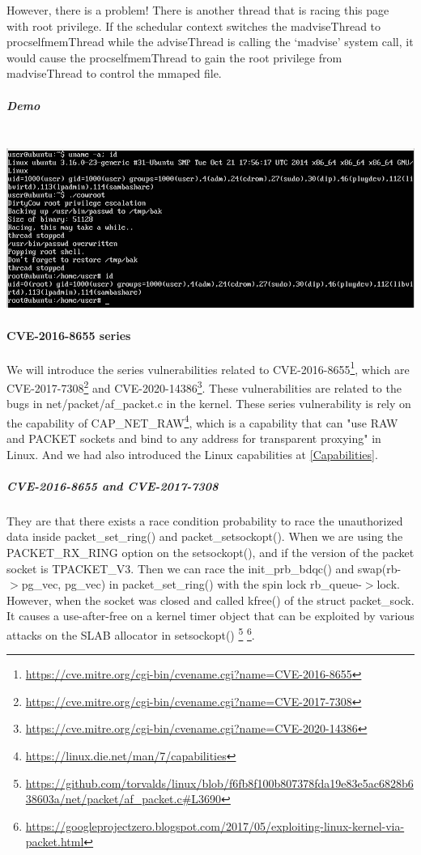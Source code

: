 However, there is a problem! There is another thread that is racing this page with root
privilege. If the schedular context switches the madviseThread to procselfmemThread while
the adviseThread is calling the `madvise' system call, it would cause the
procselfmemThread to gain the root privilege from madviseThread to control the mmaped file.

\subparagraph{Demo}\mbox{}\\
\includegraphics[width=.5\textwidth]{src/Screenshot_2021-12-26_05-14-58.png}
\label{qemumachine}

\paragraph{CVE-2016-8655 series}
We will introduce the series vulnerabilities related to CVE-2016-8655\footnote{
    \url{https://cve.mitre.org/cgi-bin/cvename.cgi?name=CVE-2016-8655}}, which are
CVE-2017-7308\footnote{\url{https://cve.mitre.org/cgi-bin/cvename.cgi?name=CVE-2017-7308}}
and CVE-2020-14386\footnote{\url{https://cve.mitre.org/cgi-bin/cvename.cgi?name=CVE-2020-14386}}.
These vulnerabilities are related to the bugs in net/packet/af\_packet.c in the kernel.
These series vulnerability is rely on the capability of CAP\_NET\_RAW\footnote{\url{https://linux.die.net/man/7/capabilities}},
which is a capability that can "use RAW and PACKET sockets and bind to
any address for transparent proxying" in Linux. And we had also introduced the Linux
capabilities at \ref{Capabilities}.

\subparagraph{CVE-2016-8655 and CVE-2017-7308} They are that there exists a race condition probability to
race the unauthorized data inside packet\_set\_ring() and packet\_setsockopt().
When we are using the PACKET\_RX\_RING option on the setsockopt(), and if the
version of the packet socket is TPACKET\_V3. Then we can race the init\_prb\_bdqc()
and swap(rb-$>$pg\_vec, pg\_vec) in packet\_set\_ring() with the spin lock rb\_queue-$>$lock.
However, when the socket was closed and called kfree() of the struct packet\_sock.
It causes a use-after-free on a kernel timer object that can be exploited
by various attacks on the SLAB allocator in setsockopt()
\footnote{\url{https://github.com/torvalds/linux/blob/f6fb8f100b807378fda19e83e5ac6828b638603a/net/packet/af\_packet.c\#L3690}}
\footnote{\url{https://googleprojectzero.blogspot.com/2017/05/exploiting-linux-kernel-via-packet.html}}.

